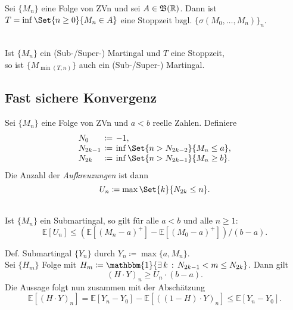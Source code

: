 \documentclass{cheat-sheet}
\newcommand{\E}{\mathbb{E}} %
\newcommand{\ind}{\mathbbm{1}} %
\newcommand{\Bor}{\mathfrak{B}} %
\begin{document}
\begin{bsp}
  Sei $\{ M_n \}$ eine Folge von ZVn und sei $A \in \Bor(\R)$.
  Dann ist $T = \inf \Set{n \geq 0}{M_n \in A}$ eine Stoppzeit bzgl. $\{ \sigma(M_0, \ldots, M_n) \}_n$.
\end{bsp}

\begin{samepage}

\begin{satz} \mbox{} \\
  Ist $\{ M_n \}$ ein (Sub-/Super-) Martingal und $T$ eine Stoppzeit, \\
  so ist $\{ M_{\min(T, n)} \}$ auch ein (Sub-/Super-) Martingal.
\end{satz}


\subsection{Fast sichere Konvergenz}

\end{samepage}

Sei $\{ M_n \}$ eine Folge von ZVn und $a < b$ reelle Zahlen.
Definiere
\[
  \arraycolsep=2pt
  \begin{array}{l c l}
    N_0 &\coloneqq& -1, \\
    N_{2k-1} &\coloneqq& \inf \Set{n > N_{2k-2}}{M_n \leq a}, \\
    N_{2k} &\coloneqq& \inf \Set{n > N_{2k-1}}{M_n \geq b}.
  \end{array}
\]
Die Anzahl der \textit{Aufkreuzungen} ist dann
\[
  U_n \coloneqq \max \Set{k}{N_{2k} \leq n}.
\]

\begin{satz} \mbox{}\\
  Ist $\{ M_n \}$ ein Submartingal, so gilt für alle $a < b$ und alle $n \geq 1$:
  \[ \E[ U_n ] \leq (\E[ (M_n - a)^{+} ] - \E[ (M_0 - a)^{+} ]) / (b - a). \]
\end{satz}

\begin{beweisskizze}
  Def. Submartingal $\{ Y_n \}$ durch $Y_n \coloneqq \max \{ a, M_n \}$. \\
  Sei $\{ H_m \}$ Folge mit $H_m \coloneqq \ind \{ \ex{k} N_{2k-1} < m \leq N_{2k} \}$.
  Dann gilt
  \[ (H \cdot Y)_n \geq U_n \cdot (b - a). \]
  Die Aussage folgt nun zusammen mit der Abschätzung
  \[ \E[(H \cdot Y)_n] = \E[Y_n - Y_0] - \E[((1-H) \cdot Y)_n] \leq \E[Y_n - Y_0]. \]
\end{beweisskizze}
\end{document}
